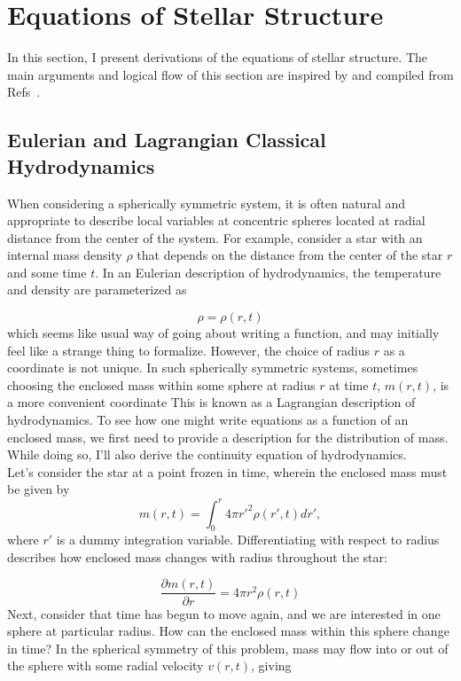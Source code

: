 \documentclass[12pt]{article}
\newcommand{\pderiv}[2]{\frac{\partial #1}{\partial #2}}
\begin{document}
\pagebreak

\setcounter{equation}{0}
\section{Equations of Stellar Structure} \label{ap:equations}
In this section, I present derivations of the equations of stellar structure. The main arguments and logical flow of this section are inspired by and compiled from Refs~\cite{KWW_book,EracleousPSU,HK_book,Cox_Giuli_vol1}.\\

\subsection{Eulerian and Lagrangian Classical Hydrodynamics}
When considering a spherically symmetric system, it is often natural and appropriate to describe local variables at concentric spheres located at radial distance from the center of the system. For example, consider a star with an internal mass density $\rho$ that depends on the distance from the center of the star $r$ and some time $t$. In an Eulerian description of hydrodynamics, the temperature and density are parameterized as

\begin{equation}  
    \rho = \rho(r,t)
\end{equation}
%
which seems like usual way of going about writing a function, and may initially feel like a strange thing to formalize. However, the choice of radius $r$ as a coordinate is not unique. In such spherically symmetric systems, sometimes choosing the enclosed mass within some sphere at radius $r$ at time $t$, $m(r,t)$, is a more convenient coordinate This is known as a Lagrangian description of hydrodynamics. To see how one might write equations as a function of an enclosed mass, we first need to provide a description for the distribution of mass. While doing so, I'll also derive the continuity equation of hydrodynamics.\\

Let's consider the star at a point frozen in time, wherein the enclosed mass must be given by
\begin{equation}
    m(r,t) = \int_0^r 4\pi r'^2 \rho(r',t) dr',
\end{equation}
%
where $r'$ is a dummy integration variable. Differentiating with respect to radius describes how enclosed mass changes with radius throughout the star:

\begin{equation}
\label{eq:radius_continuity}
\pderiv{m(r,t)}{r} = 4\pi r^2 \rho(r,t)
\end{equation}
%
Next, consider that time has begun to move again, and we are interested in one sphere at particular radius. How can the enclosed mass within this sphere change in time? In the spherical symmetry of this problem, mass may flow into or out of the sphere with some radial velocity $v(r,t)$, giving
\end{document}
